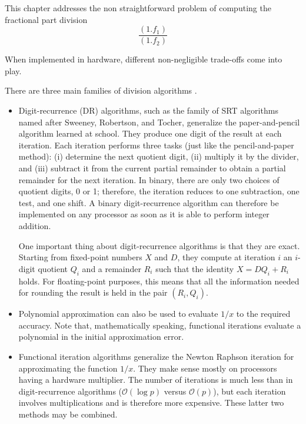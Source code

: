 This chapter addresses the non straightforward problem of computing the fractional part division
\begin{equation}
\frac{(1.f_1)}{(1.f_2)}
\end{equation}

When implemented in hardware, different non-negligible trade-offs come into play.

There are three main families of division algorithms \cite{muller_hardware_2010}. 

\begin{itemize}

\item Digit-recurrence (DR) algorithms, such as the family of SRT algorithms named after Sweeney, Robertson, and Tocher, %
generalize the paper-and-pencil algorithm learned at school. They produce one digit of the result at each iteration. Each iteration performs three tasks (just like the pencil-and-paper method): (i) determine the next quotient digit, (ii) multiply it by the divider, and (iii) subtract it from the current partial remainder to obtain a partial remainder for the next iteration.
In binary, there are only two choices of quotient digits, 0 or 1; therefore, the iteration reduces to one subtraction, one test, and one shift. 
A binary digit-recurrence algorithm can therefore be implemented on any processor as soon as it is able to perform integer addition.

One important thing about digit-recurrence algorithms is that they are exact. Starting from fixed-point numbers $X$ and $D$, they compute at iteration $i$ an $i$-digit quotient $Q_i$ and a remainder $R_i$ such that the identity $X = DQ_i + R_i$ holds.
For floating-point purposes, this means that all the information needed for rounding the result is held in the pair $(R_i, Q_i)$.


\item Polynomial approximation can also be used to evaluate $1/x$ to the required accuracy. %
Note that, mathematically speaking, functional iterations evaluate a polynomial in the initial approximation error. %

\item Functional iteration algorithms generalize the Newton Raphson iteration for approximating the function $1/x$. They make sense mostly on processors having a hardware multiplier. The number of iterations is much less than in digit-recurrence algorithms ($\mathcal{O}(\log p)$ versus $\mathcal{O}(p)$), but each iteration involves multiplications and is therefore more expensive. These latter two methods may be combined.
\end{itemize}

